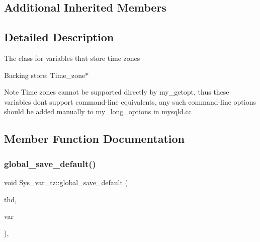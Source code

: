 \subsection*{Additional Inherited Members}


\subsection{Detailed Description}
The class for variables that store time zones

Backing store\+: Time\+\_\+zone$\ast$

\begin{DoxyNote}{Note}
Time zones cannot be supported directly by my\+\_\+getopt, thus these variables don\textquotesingle{}t support command-\/line equivalents, any such command-\/line options should be added manually to my\+\_\+long\+\_\+options in mysqld.\+cc 
\end{DoxyNote}


\subsection{Member Function Documentation}
\mbox{\label{classSys__var__tz_ac1b0b8a24189b13a4b5d3798ac8aed1a}} 
\subsubsection{\texorpdfstring{global\+\_\+save\+\_\+default()}{global\_save\_default()}}
{\footnotesize\ttfamily void Sys\+\_\+var\+\_\+tz\+::global\+\_\+save\+\_\+default (\begin{DoxyParamCaption}\item[{T\+HD $\ast$}]{thd,  }\item[{\mbox{\hyperlink{classset__var}{set\+\_\+var}} $\ast$}]{var }\end{DoxyParamCaption})\hspace{0.3cm}{\ttfamily [inline]}, {\ttfamily [virtual]}}

